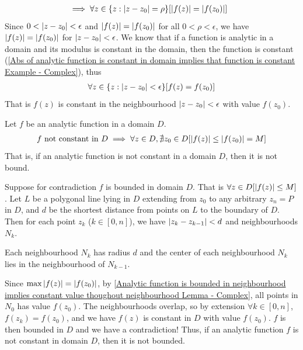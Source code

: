 \documentclass[12pt, english]{book}
\makeatletter
\renewenvironment{proof}[1][\proofname]{\par
	\pushQED{\qed}%
	\normalfont \topsep6\p@\@plus6\p@\relax
	\list{}{%
		\settowidth{\leftmargin}{\itshape\proofname:\hskip\labelsep}%
		\setlength{\labelwidth}{0pt}%
		\setlength{\itemindent}{-\leftmargin}%
	}%
	\item[\hskip\labelsep\itshape#1\@addpunct{:}]\ignorespaces
	}{ \popQED\endlist\@endpefalse}
\makeatother
\begin{document}
\begin{proof}
\begin{align*}
			&\implies \forall z \in \{z : \abs{z - z_0} = \rho\}[\abs{f(z)} = \abs{f(z_0)}]
		\end{align*}
		Since \(0 < \abs{z - z_0} < \epsilon\) and \(\abs{f(z)} = \abs{f(z_0)}\) for all \(0<\rho<\epsilon\), we have \(\abs{f(z)} = \abs{f(z_0)}\) for \(\abs{z-z_0} < \epsilon\). We know that if a function is analytic in a domain and its modulus is constant in the domain, then the function is constant (\cref{Abs of analytic function is constant in domain implies that function is constant Example - Complex}), thus 
		\begin{align*}
			\forall z \in \{z : \abs{z-z_0}<\epsilon\} [f(z) = f(z_0)]
		\end{align*}
		That is \(f(z)\) is constant in the neighbourhood \(\abs{z-z_0}<\epsilon\) with value \(f(z_0)\).
	\end{proof}
	
	\begin{theorem}
		\label{Maximum Modulus Principle Theorem - Complex}
		Let \(f\) be an analytic function in a domain \(D\).
		\begin{align*}
			f \text{ not constant in } D \implies \forall z \in D, \nexists z_0 \in D [\abs{f(z)} \leq \abs{f(z_0)} = M]
		\end{align*}
		That is, if an analytic function is not constant in a domain \(D\), then it is not bound.
	\end{theorem}
	\begin{proof}
		Suppose for contradiction \(f\) is bounded in domain \(D\). That is \(\forall z \in D [\abs{f(z)} \leq M]\). Let \(L\) be a polygonal line lying in \(D\) extending from \(z_0\) to any arbitrary \(z_n = P\) in \(D\), and \(d\) be the shortest distance from points on \(L\) to the boundary of \(D\). Then for each point \(z_k\) (\(k \in [0, n]\)), we have \(\abs{z_k - z_{k-1}} < d\) and neighbourhoods \(N_k\).
		
		Each neighbourhood \(N_k\) has radius \(d\) and the center of each neighbourhood \(N_k\) lies in the neighbourhood of \(N_{k-1}\).
		
		Since \(\max \abs{f(z)} = \abs{f(z_0)}\), by \cref{Analytic function is bounded in neighbourhood implies constant value thoughout neighbourhood Lemma - Complex}, all points in \(N_0\) has value \(f(z_0)\). The neighbourhoods overlap, so by extension \(\forall k \in [0, n]\), \(f(z_k) = f(z_0)\), and we have \(f(z)\) is constant in \(D\) with value \(f(z_0)\). \(f\) is then bounded in \(D\) and we have a contradiction! Thus, if an analytic function \(f\) is not constant in domain \(D\), then it is not bounded.
	\end{proof}
\end{document}
